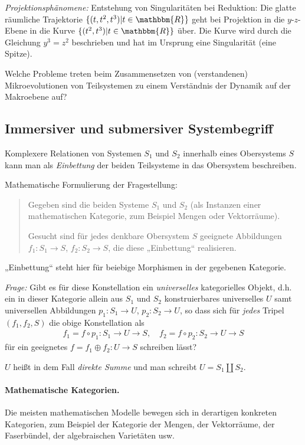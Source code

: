 \documentclass[11pt,a4paper]{article}
\begin{document}
\emph{Projektionsphänomene:} Entstehung von Singularitäten bei Reduktion: Die
glatte räumliche Trajektorie $\{(t,t^2,t^3)|t\in\mathbbm{R}\}$ geht bei
Projektion in die $y$-$z$-Ebene in die Kurve $\{(t^2,t^3)|t\in\mathbbm{R}\}$
über. Die Kurve wird durch die Gleichung $y^3=z^2$ beschrieben und hat im
Ursprung eine Singularität (eine Spitze).

Welche Probleme treten beim Zusammensetzen von (verstandenen) Mikroevolutionen
von Teilsystemen zu einem Verständnis der Dynamik auf der Makroebene auf?

\subsection{Immersiver und submersiver Systembegriff}

Komplexere Relationen von Systemen $S_1$ und $S_2$ innerhalb eines Obersystems
$S$ kann man als \emph{Einbettung} der beiden Teilsysteme in das Obersystem
beschreiben.

Mathematische Formulierung der Fragestellung: 
\begin{quote}
  Gegeben sind die beiden Systeme $S_1$ und $S_2$ (als Instanzen einer
  mathematischen Kategorie, zum Beispiel Mengen oder Vektorräume).
  
  Gesucht sind für jedes denkbare Obersystem $S$ geeignete Abbildungen $f_1:
  S_1 \rightarrow S$, $f_2: S_2 \rightarrow S$, die diese „Einbettung“
  realisieren.
\end{quote}
„Einbettung“ steht hier für beiebige Morphismen in der gegebenen Kategorie. 

\emph{Frage:} Gibt es für diese Konstellation ein \emph{universelles}
kategorielles Objekt, d.h. ein in dieser Kategorie allein aus $S_1$ und $S_2$
konstruierbares universelles $U$ samt universellen Abbildungen $p_1: S_1
\rightarrow U$, $p_2: S_2 \rightarrow U$, so dass sich für \emph{jedes} Tripel
$(f_1, f_2, S)$ die obige Konstellation als
\begin{gather*}
  f_1 = f \circ p_1: S_1 \rightarrow U \rightarrow S,\quad f_2 = f \circ p_2:
  S_2 \rightarrow U \rightarrow S
\end{gather*}
für ein geeignetes $f = f_1\oplus f_2: U \rightarrow  S$ schreiben lässt?

$U$ heißt in dem Fall \emph{direkte Summe} und man schreibt $U = S_1\coprod
S_2$.

\paragraph{Mathematische Kategorien.}
Die meisten mathematischen Modelle bewegen sich in derartigen konkreten
Kategorien, zum Beispiel der Kategorie der Mengen, der Vektorräume, der
Faserbündel, der algebraischen Varietäten usw.
\end{document}
